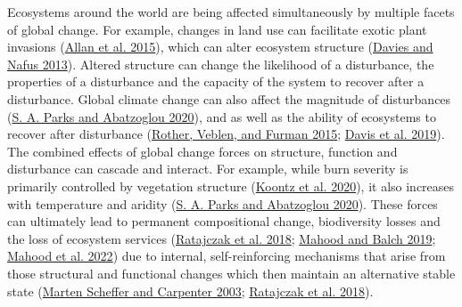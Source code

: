 \documentclass[
  12pt,
]{article}
\begin{document}
Ecosystems around the world are being affected simultaneously by
multiple facets of global change. For example, changes in land use can
facilitate exotic plant invasions
(\protect\hyperlink{ref-Allan2015}{Allan et al. 2015}), which can alter
ecosystem structure (\protect\hyperlink{ref-Davies2013}{Davies and Nafus
2013}). Altered structure can change the likelihood of a disturbance,
the properties of a disturbance and the capacity of the system to
recover after a disturbance. Global climate change can also affect the
magnitude of disturbances (\protect\hyperlink{ref-Parks2020}{S. A. Parks
and Abatzoglou 2020}), and as well as the ability of ecosystems to
recover after disturbance (\protect\hyperlink{ref-Rother2015}{Rother,
Veblen, and Furman 2015}; \protect\hyperlink{ref-Davis2019}{Davis et al.
2019}). The combined effects of global change forces on structure,
function and disturbance can cascade and interact. For example, while
burn severity is primarily controlled by vegetation structure
(\protect\hyperlink{ref-Koontz2020}{Koontz et al. 2020}), it also
increases with temperature and aridity
(\protect\hyperlink{ref-Parks2020}{S. A. Parks and Abatzoglou 2020}).
These forces can ultimately lead to permanent compositional change,
biodiversity losses and the loss of ecosystem services
(\protect\hyperlink{ref-Ratajczak2018}{Ratajczak et al. 2018};
\protect\hyperlink{ref-Mahood2019}{Mahood and Balch 2019};
\protect\hyperlink{ref-Mahood2021}{Mahood et al. 2022}) due to internal,
self-reinforcing mechanisms that arise from those structural and
functional changes which then maintain an alternative stable state
(\protect\hyperlink{ref-Scheffer2003}{Marten Scheffer and Carpenter
2003}; \protect\hyperlink{ref-Ratajczak2018}{Ratajczak et al. 2018}).
\end{document}
